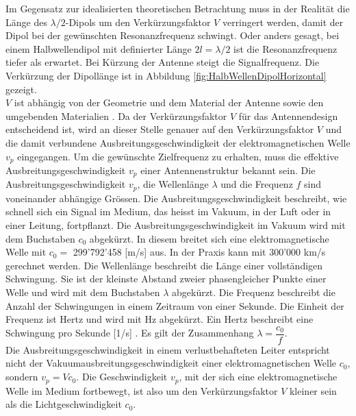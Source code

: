 Im Gegensatz zur idealisierten theoretischen Betrachtung muss in der Realität die Länge des $\lambda /2$-Dipols um den Verkürzungsfaktor $V$ verringert werden, damit der Dipol bei der gewünschten Resonanzfrequenz schwingt. Oder anders gesagt, bei einem Halbwellendipol mit definierter Länge $2l=\lambda/2$ ist die Resonanzfrequenz tiefer als erwartet. Bei Kürzung der Antenne steigt die Signalfrequenz. Die Verkürzung der Dipollänge ist in Abbildung \ref{fig:HalbWellenDipolHorizontal} gezeigt. \\
$V$ ist abhängig von der Geometrie und dem Material der Antenne sowie den umgebenden Materialien \cite{Hcuno}. Da der Verkürzungsfaktor $V$ für das Antennendesign entscheidend ist,  wird an dieser Stelle genauer auf den Verkürzungsfaktor $V$ und die damit verbundene Ausbreitungsgeschwindigkeit der elektromagnetischen Welle $v_p$ eingegangen. Um die gewünschte Zielfrequenz zu erhalten, muss die effektive Ausbreitungsgeschwindigkeit $v_p$ einer Antennenstruktur bekannt sein. Die Ausbreitungsgeschwindigkeit $v_p$, die Wellenlänge $\lambda$ und die Frequenz $f$ sind voneinander abhängige Grössen. Die Ausbreitungsgeschwindigkeit beschreibt, wie schnell sich ein Signal im Medium, das heisst im Vakuum, in der Luft oder in einer Leitung, fortpflanzt. Die Ausbreitungsgeschwindigkeit im Vakuum wird mit dem Buchstaben $c_0$ abgekürzt. In diesem breitet sich eine elektromagnetische Welle mit $c_0 = $ 299'792’458 [m/s] aus. In der Praxis kann mit 300'000 km/s gerechnet werden. Die Wellenlänge beschreibt die Länge einer vollständigen Schwingung. Sie ist der kleinste Abstand zweier phasengleicher Punkte einer Welle und wird mit dem Buchstaben $\lambda$ abgekürzt. Die Frequenz beschreibt die Anzahl der Schwingungen in einem Zeitraum von einer Sekunde. Die Einheit der Frequenz ist Hertz und wird mit Hz abgekürzt. Ein Hertz beschreibt eine Schwingung pro Sekunde [1/s] \cite{Verkuertzungsfaktor}.
Es gilt der Zusammenhang $\lambda = \dfrac{c_0}{f}$. \\
Die Ausbreitungsgeschwindigkeit in einem verlustbehafteten Leiter entspricht nicht der Vakuumausbreitungsgeschwindigkeit einer elektromagnetischen Welle $c_0$, sondern $v_p=V c_0$. Die Geschwindigkeit $v_p$, mit der sich eine elektromagnetische Welle im Medium fortbewegt, ist also um den Verkürzungsfaktor $V$ kleiner sein als die Lichtgeschwindigkeit $c_0$.\\ 

